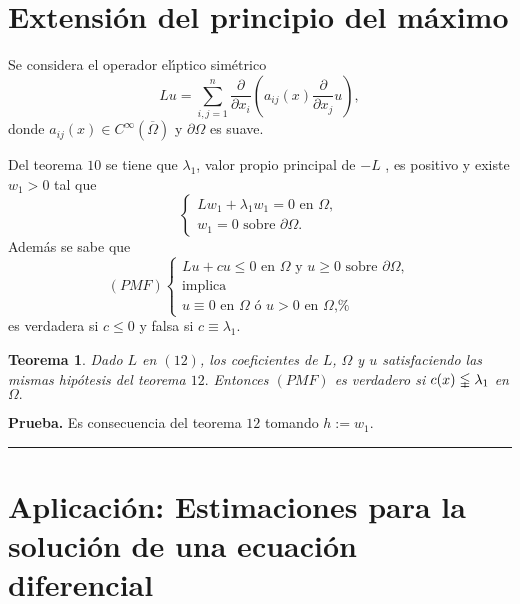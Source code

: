\documentclass{article}
\newtheorem{theorem}{Teorema}
\newenvironment{proof}[1][Prueba]{\textbf{#1.} }{\ \rule{0.5em}{0.5em}}
\begin{document}
\section{Extensi\'{o}n del principio del m\'{a}ximo}

Se considera el operador el\'{\i}ptico sim\'{e}trico 
\begin{equation}
Lu=\sum_{i,j=1}^{n}\frac{\partial }{\partial x_{i}}\left( a_{ij}\left(
x\right) \frac{\partial }{\partial x_{j}}u\right) ,  \tag{12}
\end{equation}
donde $a_{ij}\left( x\right) \in C^{\infty }\left( \overline{\Omega }\right) 
$ y $\partial \Omega $ es suave.

Del teorema $10$ se tiene que $\lambda _{1}$, valor propio principal de $-L$%
, es positivo y existe $w_{1}>0$ tal que 
\begin{equation*}
\left\{ 
\begin{array}{c}
Lw_{1}+\lambda _{1}w_{1}=0\text{ \ en }\Omega , \\ 
w_{1}=0\text{ \ sobre }\partial \Omega .
\end{array}
\right.
\end{equation*}
Adem\'{a}s se sabe que 
\begin{equation*}
\left( PMF\right) \left\{ 
\begin{array}{c}
Lu+cu\leq 0\text{ \ en }\Omega \text{ y }u\geq 0\text{ sobre }\partial
\Omega , \\ 
\text{implica} \\ 
u\equiv 0\text{ \ en }\Omega \text{ \ \'{o} \ }u>0\text{ \ en }\Omega \text{,%
}
\end{array}
\right.
\end{equation*}
es verdadera si $c\leq 0$ y falsa si $c\equiv \lambda _{1}.$

\begin{theorem}
Dado $L$ en $\left( 12\right) $, los coeficientes de $L$, $\Omega $ y $u$
satisfaciendo las mismas hip\'{o}tesis del teorema $12.$ Entonces $\left(
PMF\right) $ es verdadero si $c(x)\lvertneqq \lambda _{1}$ en $\Omega .$
\end{theorem}

\begin{proof}
Es consecuencia del teorema $12$ tomando $h:=w_{1}.$
\end{proof}

\section{Aplicaci\'{o}n: Estimaciones para la soluci\'{o}n de una
ecuaci\'{o}n diferencial}
\end{document}
